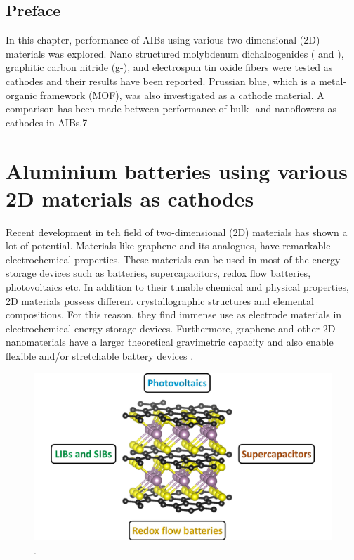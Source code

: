 \section*{Preface}
In this chapter, performance of AIBs using various two-dimensional (2D) materials was explored. Nano structured molybdenum dichalcogenides ( and ), graphitic carbon nitride (g-), and electrospun tin oxide  fibers were tested as cathodes and their results have been reported. Prussian blue, which is a metal-organic framework (MOF), was also investigated as a cathode material. A comparison has been made between performance of bulk- and  nanoflowers as cathodes in AIBs.7 
\pagebreak
\chapter{Aluminium batteries using various 2D materials as cathodes} 
\label{chap6} 
Recent development in teh field of two-dimensional (2D) materials has shown a lot of potential. Materials like graphene and its analogues, have remarkable electrochemical properties. These materials can be used in most of the energy storage devices such as batteries, supercapacitors, redox flow batteries, photovoltaics etc. In addition to their tunable chemical and physical properties, 2D materials possess different crystallographic structures and elemental compositions. For this reason, they find immense use as electrode materials in electrochemical energy storage devices\cite{wang_graphene_2009,bonaccorso_graphene_2015}. Furthermore, graphene and other 2D nanomaterials have a larger theoretical gravimetric capacity and also enable flexible and/or stretchable battery devices \cite{zhou_progress_2014}. 

\begin{figure}[h!]
  \centering
  \includegraphics[width=\textwidth]{Figures/chap6fig/nanoTMDintro.pdf}
    \caption{.}
  \label{Figures/chap6fig:nanoTMDintro}
\end{figure}

